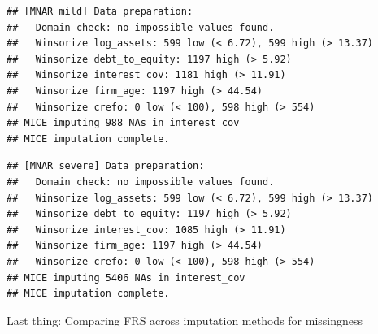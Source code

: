 \documentclass[
]{article}
\newenvironment{Shaded}{\begin{snugshade}}{\end{snugshade}}
\newcommand{\AttributeTok}[1]{\textcolor[rgb]{0.13,0.29,0.53}{#1}}
\newcommand{\FunctionTok}[1]{\textcolor[rgb]{0.13,0.29,0.53}{\textbf{#1}}}
\newcommand{\NormalTok}[1]{#1}
\newcommand{\OtherTok}[1]{\textcolor[rgb]{0.56,0.35,0.01}{#1}}
\newcommand{\SpecialCharTok}[1]{\textcolor[rgb]{0.81,0.36,0.00}{\textbf{#1}}}
\newcommand{\StringTok}[1]{\textcolor[rgb]{0.31,0.60,0.02}{#1}}
\begin{document}
\begin{Shaded}
\end{Shaded}

\begin{verbatim}
## [MNAR mild] Data preparation:
##   Domain check: no impossible values found.
##   Winsorize log_assets: 599 low (< 6.72), 599 high (> 13.37)
##   Winsorize debt_to_equity: 1197 high (> 5.92)
##   Winsorize interest_cov: 1181 high (> 11.91)
##   Winsorize firm_age: 1197 high (> 44.54)
##   Winsorize crefo: 0 low (< 100), 598 high (> 554)
## MICE imputing 988 NAs in interest_cov
## MICE imputation complete.
\end{verbatim}

\begin{Shaded}
\end{Shaded}

\begin{verbatim}
## [MNAR severe] Data preparation:
##   Domain check: no impossible values found.
##   Winsorize log_assets: 599 low (< 6.72), 599 high (> 13.37)
##   Winsorize debt_to_equity: 1197 high (> 5.92)
##   Winsorize interest_cov: 1085 high (> 11.91)
##   Winsorize firm_age: 1197 high (> 44.54)
##   Winsorize crefo: 0 low (< 100), 598 high (> 554)
## MICE imputing 5406 NAs in interest_cov
## MICE imputation complete.
\end{verbatim}

Last thing: Comparing FRS across imputation methods for missingness
\end{document}
